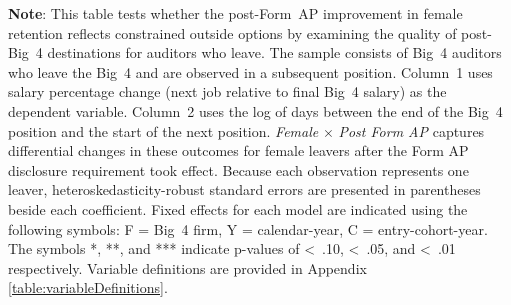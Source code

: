 \documentclass[11pt]{article}
\begin{document}
\clearpage
\begin{table}[!htbp]
\begin{flushleft}
    \begin{threeparttable}[b]

        \captionsetup{labelfont=bf, singlelinecheck=off, justification=raggedright, labelsep=none}
        \caption{: Destination outcomes for Big 4 leavers}

        

        \begin{tablenotes}
            \footnotesize
            \item \textbf{Note}: This table tests whether the post-Form~AP improvement in female retention reflects constrained outside options by examining the quality of post-Big~4 destinations for auditors who leave. The sample consists of Big~4 auditors who leave the Big~4 and are observed in a subsequent position. Column~1 uses salary percentage change (next job relative to final Big~4 salary) as the dependent variable. Column~2 uses the log of days between the end of the Big~4 position and the start of the next position. \textit{Female} $\times$ \textit{Post Form AP} captures differential changes in these outcomes for female leavers after the Form AP disclosure requirement took effect. Because each observation represents one leaver, heteroskedasticity-robust standard errors are presented in parentheses beside each coefficient. Fixed effects for each model are indicated using the following symbols: F = Big~4 firm, Y = calendar-year, C = entry-cohort-year. The symbols *, **, and *** indicate p-values of \textless\, .10, \textless\, .05, and \textless\, .01 respectively. Variable definitions are provided in Appendix \ref{table:variableDefinitions}.
        \end{tablenotes}
        \label{table:leavers}
    \end{threeparttable}
\end{flushleft}
\end{table}
\end{document}

